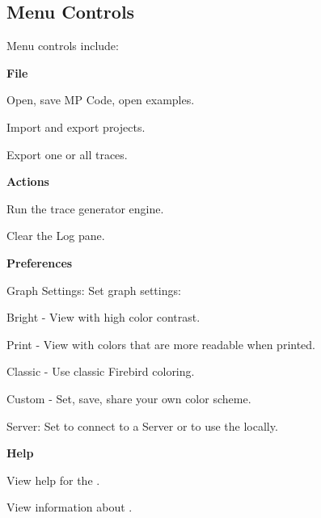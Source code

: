 \documentclass[11pt,fleqn]{article} %
\begin{document}
\subsection{Menu Controls}
Menu controls include:
\begin{compactitem}
\item \textbf{File}
  \begin{compactitem}
  \item Open, save MP Code, open examples.
  \item Import and export projects.
  \item Export one or all traces.
  \end{compactitem}
\item \textbf{Actions}
  \begin{compactitem}
  \item Run the trace generator engine.
  \item Clear the Log pane.
  \end{compactitem}
\item \textbf{Preferences}
  \begin{compactitem}
  \item Graph Settings: Set graph settings:
    \begin{compactitem}
    \item Bright - View with high color contrast.
    \item Print - View with colors that are more readable when printed.
    \item Classic - Use classic Firebird coloring.
    \item Custom - Set, save, share your own color scheme.
    \end{compactitem}
  \item Server: Set to connect to a \gtg Server or to use the \gtg locally.
  \end{compactitem}
\item \textbf{Help}
  \begin{compactitem}
  \item View help for the \mpgt.
  \item View information about \mpgt.
  \end{compactitem}
\end{compactitem}
\end{document}
